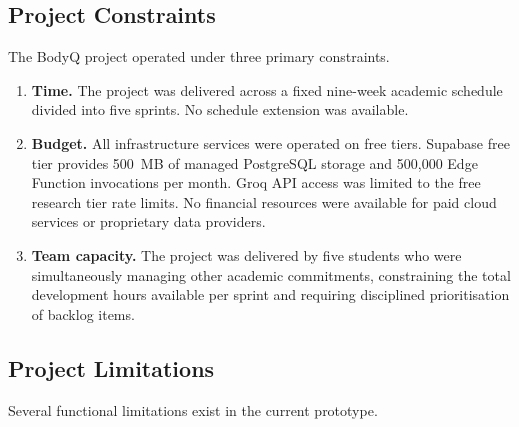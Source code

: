 \subsection{Project Constraints}

The BodyQ project operated under three primary constraints.

\begin{enumerate}
	\item \textbf{Time.} The project was delivered across a fixed
	nine-week academic schedule divided into five sprints. No schedule
	extension was available.
	
	\item \textbf{Budget.} All infrastructure services were operated on
	free tiers. Supabase free tier provides 500~MB of managed PostgreSQL
	storage and 500{,}000 Edge Function invocations per month. Groq API
	access was limited to the free research tier rate limits. No financial
	resources were available for paid cloud services or proprietary data
	providers.
	
	\item \textbf{Team capacity.} The project was delivered by five
	students who were simultaneously managing other academic commitments,
	constraining the total development hours available per sprint and
	requiring disciplined prioritisation of backlog items.
\end{enumerate}

\subsection{Project Limitations}

Several functional limitations exist in the current prototype.

